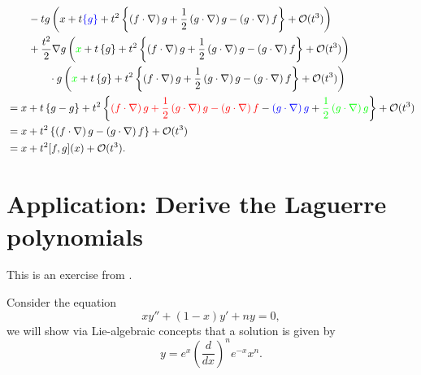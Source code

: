 \begin{equation*}
\begin{aligned}
           & \qquad - t g \left( x + t \textcolor{blue}{\left\{ g \right\}} + t^2 \left\{  \left( f \cdot \nabla \right) g  + \frac{1}{2} \left( g \cdot \nabla \right) g  - \left(g \cdot \nabla \right) f    \right\} + \mathcal O(t^3) \right)                                                                                                                            \\
           & \qquad + \frac{t^2}{2} \nabla g \left( \textcolor{green}{x} + t \left\{ g \right\} + t^2 \left\{  \left( f \cdot \nabla \right) g  + \frac{1}{2} \left( g \cdot \nabla \right) g  - \left(g \cdot \nabla \right) f   \right\} + \mathcal O(t^3) \right)                                                                                                         \\
           & \qquad \qquad \cdot g \left(  \textcolor{green}{x} + t \left\{ g \right\} + t^2 \left\{  \left( f \cdot \nabla \right) g  + \frac{1}{2} \left( g \cdot \nabla \right) g  - \left(g \cdot \nabla \right) f   \right\} + \mathcal O(t^3) \right)                                                                                                                  \\
           & = x + t \left\{g-g \right\} + t^2 \left\{ \textcolor{red}{ \left( f \cdot \nabla \right) g  + \frac{1}{2} \left( g \cdot \nabla \right) g  - \left(g \cdot \nabla \right) f }  - \textcolor{blue}{ \left( g \cdot \nabla \right) g } + \textcolor{green}{ \frac{1}{2}  \left( g \cdot \nabla \right) g  } \right\} + \mathcal O(t^3)                            \\
           & = x + t^2 \left\{  \left( f \cdot \nabla \right) g - \left(g \cdot \nabla \right) f  \right\} + \mathcal O(t^3)                                                                                                                                                                                                                                                 \\
           & = x + t^2 [f,g](x) + \mathcal O(t^3).
  \end{aligned}
\end{equation*}


\section{Application: Derive the Laguerre polynomials}

This is an exercise from \cite{howe_very_1983}.

Consider the equation
$$
  x y'' + (1-x) y' + ny = 0,
$$
we will show via Lie-algebraic concepts that a solution is given by
$$
  y = e^x \left(\frac{d}{dx} \right)^n  e^{-x} x^n.
$$

